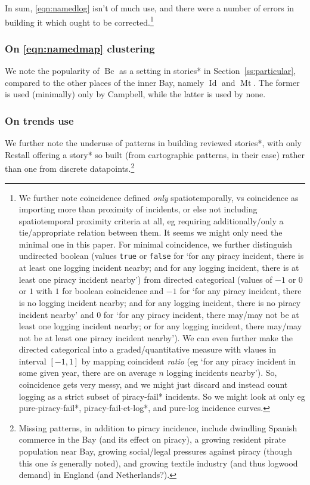 \documentclass{amsart}
\newcommand{\code}[1]{\texttt{#1}} %
\newcommand{\ment}[1]{\textit{#1}} %
\DeclareMathOperator{\id}{Id} %
\DeclareMathOperator{\mt}{Mt} %
\DeclareMathOperator{\bc}{Bc} %
\theoremstyle{definition}
\theoremstyle{remark}
\begin{document}
		In sum, \ref{eqn:namedlog} isn't of much use, and there were a number of errors in building it which ought to be corrected.\footnote{We further note coincidence defined \emph{only} spatiotemporally, vs coincidence as importing more than proximity of incidents, or else not including spatiotemporal proximity criteria at all, eg requiring additionally/only a tie/appropriate relation between them. It seems we might only need the minimal one in this paper. For minimal coincidence, we further distinguish undirected boolean (values \code{true} or \code{false} for `for any piracy incident, there is at least one logging incident nearby; and for any logging incident, there is at least one piracy incident nearby') from directed categorical (values of \(-1\) or \(0\) or \(1\) with \(1\) for boolean coincidence and \(-1\) for `for any piracy incident, there is no logging incident nearby; and for any logging incident, there is no piracy incident nearby' and \(0\) for `for any piracy incident, there may/may not be at least one logging incident nearby; or for any logging incident, there may/may not be at least one piracy incident nearby'). We can even further make the directed categorical into a graded/quantitative measure with vlaues in interval \([-1,1]\) by mapping coincident \ment{ratio} (eg `for any piracy incident in some given year, there are on average \(n\) logging incidents nearby'). So, coincidence gets very messy, and we might just discard and instead count logging as a strict subset of piracy-fail* incidents. So we might look at only eg pure-piracy-fail*, piracy-fail-et-log*, and pure-log incidence curves.} %
		\subsubsection{On \ref{eqn:namedmap} clustering}
		\label{sss:onmapclusters}
		We note the popularity of \(\bc\) as a setting in stories* in Section~\ref{ss:particular}, compared to the other places of the inner Bay, namely \(\id\) and \(\mt\). The former is used (minimally) only by Campbell, while the latter is used by none.
		\subsubsection{On trends use}
		\label{sss:ontrendsuse}
		We further note the underuse of patterns in building reviewed stories*, with only Restall offering a story* so built (from cartographic patterns, in their case) rather than one from discrete datapoints.\footnote{Missing patterns, in addition to piracy incidence, include dwindling Spanish commerce in the Bay (and its effect on piracy), a growing resident pirate population near Bay, growing social/legal pressures against piracy (though this one \emph{is} generally noted), and growing textile industry (and thus logwood demand) in England (and Netherlands?).}
\end{document}
